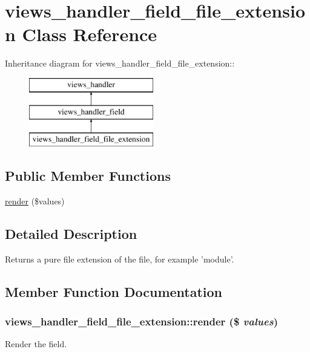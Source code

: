 \hypertarget{classviews__handler__field__file__extension}{
\section{views\_\-handler\_\-field\_\-file\_\-extension Class Reference}
\label{classviews__handler__field__file__extension}
}
Inheritance diagram for views\_\-handler\_\-field\_\-file\_\-extension::\begin{figure}[H]
\begin{center}
\leavevmode
\includegraphics[height=3cm]{classviews__handler__field__file__extension}
\end{center}
\end{figure}
\subsection*{Public Member Functions}
\begin{DoxyCompactItemize}
\item 
\hyperlink{classviews__handler__field__file__extension_a143bfd3742f35bef651f1c8b316c8075}{render} (\$values)
\end{DoxyCompactItemize}


\subsection{Detailed Description}
Returns a pure file extension of the file, for example 'module'. 

\subsection{Member Function Documentation}
\hypertarget{classviews__handler__field__file__extension_a143bfd3742f35bef651f1c8b316c8075}{
\subsubsection[{render}]{\setlength{\rightskip}{0pt plus 5cm}views\_\-handler\_\-field\_\-file\_\-extension::render (\$ {\em values})}}
\label{classviews__handler__field__file__extension_a143bfd3742f35bef651f1c8b316c8075}
Render the field.


